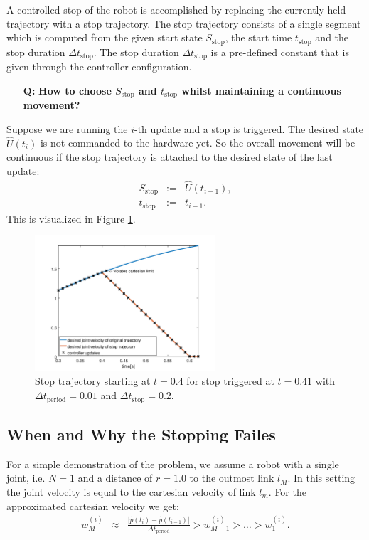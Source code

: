 \documentclass{article}
\begin{document}
A controlled stop of the robot is accomplished by replacing the currently held trajectory with a stop trajectory. The stop trajectory consists of a single segment which is computed from the given start state $S_{\mathrm{stop}}$, the start time $t_{\mathrm{stop}}$ and the stop duration $\Delta t_{\mathrm{stop}}$. The stop duration $\Delta t_{\mathrm{stop}}$ is a pre-defined constant that is given through the controller configuration.
\begin{itemize}
\item[\bf Q:] {\bf How to choose $S_{\mathrm{stop}}$ and $t_{\mathrm{stop}}$ whilst maintaining a continuous movement?}
\end{itemize}
Suppose we are running the $i$-th update and a stop is triggered. The desired state $\hat{U}(t_i)$ is not commanded to the hardware yet. So the overall movement will be continuous if the stop trajectory is attached to the desired state of the last update:
\begin{eqnarray}
S_{\mathrm{stop}} &:=& \hat{U}(t_{i-1}), \label{eq:stop_choice}\\
t_{\mathrm{stop}} &:=& t_{i-1}.
\end{eqnarray}
This is visualized in Figure \ref{fig:stop_trajectory}.

\begin{figure}
\centering
\includegraphics[width=0.6\textwidth]{figures/stop_trajectory_plot.png}
\caption{Stop trajectory starting at $t=0.4$ for stop triggered at $t=0.41$ with $\Delta t_{\mathrm{period}}=0.01$ and $\Delta t_{\mathrm{stop}}=0.2$.}
\label{fig:stop_trajectory}
\end{figure}

\subsection{When and Why the Stopping Failes}\label{sec:why_the_stopping_failes}

For a simple demonstration of the problem, we assume a robot with a single joint, i.e. $N=1$ and a distance of $r=1.0$ to the outmost link $l_M$. In this setting the joint velocity is equal to the cartesian velocity of link $l_m$. For the approximated cartesian velocity we get:
\begin{eqnarray}
w_M^{(i)} &\approx& \frac{|\hat{p}(t_i)-\hat{p}(t_{i-1})|}{\Delta t_{\mathrm{period}}} > w_{M-1}^{(i)} > \dots > w_1^{(i)}. \label{eq:differential_quotient}
\end{eqnarray}
\end{document}
